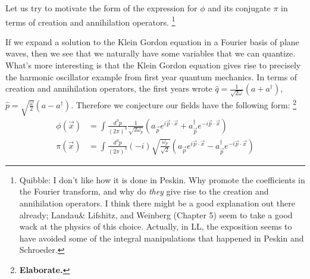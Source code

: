 \documentclass{report}
\theoremstyle{plain}
\theoremstyle{definition}
\theoremstyle{remark}
\newcommand{\FR}[2]{\frac{#1}{#2}}
\newcommand{\SFR}[2]{\sqrt{\frac{#1}{#2}}}
\newcommand{\om}{\omega}
\newcommand{\elaborate}{{\color{blue} \textbf{Elaborate.}}}
\begin{document}
Let us try to motivate the form of the expression for $\phi$ and its
conjugate $\pi$ in terms of creation and annihilation operators.
\footnote{Quibble: I don't like how it is done in Peskin. Why promote the
coefficients in the Fourier transform, and why do \emph{they} give rise to
the creation and annihilation operators. I think there might be a good
explanation out there already; Landau\& Lifshitz, and Weinberg (Chapter 5) seem to take
a good wack at the physics of this choice. Actually, in LL, the exposition
seems to have avoided some of the integral manipulations that happened in
Peskin and Schroeder.}

If we expand a solution to the Klein Gordon equation in a Fourier
basis of plane waves, then we see that we naturally have some
variables that we can quantize. What's more interesting is that the
Klein Gordon equation gives rise to precisely the harmonic oscillator
example from first year quantum mechanics. In terms of creation and
annihilation operators, the first years wrote
$\hat q = \FR{1}{\sqrt{2\om}}(a+a^\dag)$,
$\hat p = \SFR{\om}{2}(a-a^\dag)$. Therefore we conjecture our fields
have the following form: \footnote{{\elaborate}}
\newcommand{\vp}{{\vec p}} \newcommand{\vx}{{\vec x}}
\begin{align*}
\phi(\vx) &= \int \FR{d^3p}{(2\pi)^3} \FR{1}{\sqrt{2\om_p}} (a_\vp e^{i\vp\cdot\vx} + a_\vp^\dag e^{-i\vp\cdot\vx})\\
\pi(\vx) &= \int \FR{d^3p}{(2\pi)^3}(-i)\SFR{\om_p}{\sqrt2} (a_\vp e^{i\vp\cdot\vx} - a_\vp^\dag e^{-i\vp\cdot\vx})
\end{align*}
\end{document}
